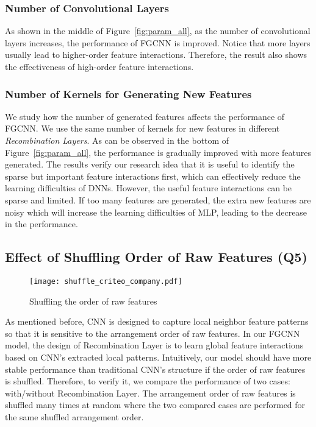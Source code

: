 \subsubsection{Number of Convolutional Layers}
As shown in  the middle of  Figure~\ref{fig:param_all}, as the number of convolutional layers increases, the performance of FGCNN is improved. Notice that more layers usually lead to higher-order feature interactions. Therefore, the result also shows the effectiveness of high-order feature interactions. 

\subsubsection{Number of Kernels for Generating New Features}
We study how the number of generated features affects the performance of FGCNN. We use the same number of kernels for new features in different \emph{Recombination Layers}.  As can be observed in the bottom of Figure~\ref{fig:param_all}, the performance is gradually improved with more features generated. The results verify our research idea that it is useful to identify the sparse but important feature interactions first, which can effectively reduce the learning difficulties of DNNs. However, the useful feature interactions can be sparse and limited. If too many  features are generated, the extra new features are noisy which will increase the learning difficulties of MLP,  leading to the decrease in the performance.

\subsection{Effect of Shuffling Order of Raw Features (Q5)}
\begin{figure}[h]
 \centering
\vspace{-2ex}
 \texttt{[image: shuffle\_criteo\_company.pdf]}\vspace{-3ex}
 \caption{Shuffling the order of raw features}\label{fig:shuffle}
 \vspace{-3ex}
 \label{shuffle}
\end{figure}

As mentioned before, CNN is designed to capture local neighbor feature patterns so that it is sensitive to the arrangement order of raw features. In our FGCNN model, the design of Recombination Layer is to learn global feature interactions based on CNN's extracted local patterns. Intuitively, our model should have more stable performance than traditional CNN's structure if the order of raw features is shuffled. Therefore,  to verify it, we compare the performance of two cases: with/without Recombination Layer. The arrangement order of raw features is shuffled many times at random where the two compared cases are performed for the same shuffled arrangement order. 


